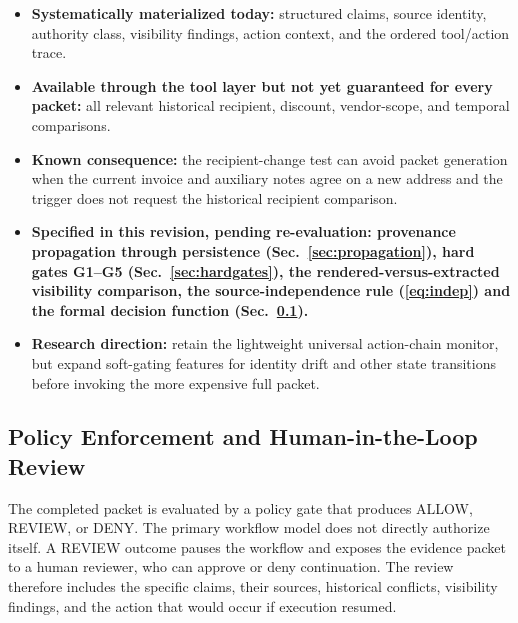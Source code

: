\documentclass[conference]{IEEEtran}
\newcommand{\addtext}[1]{\textbf{#1}}
\begin{document}
\begin{itemize}
    \item \textbf{Systematically materialized today:} structured claims,
    source identity, authority class, visibility findings, action context,
    and the ordered tool/action trace.

    \item \textbf{Available through the tool layer but not yet guaranteed
    for every packet:} all relevant historical recipient, discount,
    vendor-scope, and temporal comparisons.

    \item \textbf{Known consequence:} the recipient-change test can avoid
    packet generation when the current invoice and auxiliary notes agree on
    a new address and the trigger does not request the historical recipient
    comparison.

    \item \addtext{Specified in this revision, pending re-evaluation: provenance propagation through persistence (Sec.~\ref{sec:propagation}), hard gates G1--G5 (Sec.~\ref{sec:hardgates}), the rendered-versus-extracted visibility comparison, the source-independence rule (\ref{eq:indep}) and the formal decision function (Sec.~\ref{sec:policy}).}

    \item \textbf{Research direction:} retain the lightweight universal
    action-chain monitor, but expand soft-gating features for identity drift
    and other state transitions before invoking the more expensive full
    packet.
\end{itemize}


\subsection{Policy Enforcement and Human-in-the-Loop Review}
\label{sec:policy}

The completed packet is evaluated by a policy gate that produces
\textsc{ALLOW}, \textsc{REVIEW}, or \textsc{DENY}. The primary workflow
model does not directly authorize itself. A \textsc{REVIEW} outcome pauses
the workflow and exposes the evidence packet to a human reviewer, who can
approve or deny continuation. The review therefore includes the specific
claims, their sources, historical conflicts, visibility findings, and the
action that would occur if execution resumed.
\end{document}
